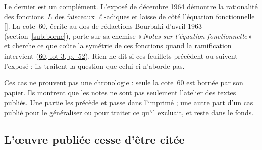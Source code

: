 \documentclass[11pt]{amsart}
\makeatletter
\newcommand{\q}[1]{«\,\textit{#1}\,»}
\def\RHM@first#1--#2\@nil{#1}
\DeclareRobustCommand{\lot}[3]{\begingroup\edef\RHM@pdfpage{\the\numexpr\RHM@first#3--\@nil+1\relax}\href{https://grothendieck.umontpellier.fr/#1.pdf\#page=\RHM@pdfpage}{#1, lot #2, p.~#3}\endgroup}
\newcommand{\lot}[3]{\href{https://grothendieck.commutator.io/\##1/#2/p#3}{#1, lot #2, p.~#3}}
\makeatother
\begin{document}
Le dernier est un complément. L'exposé de décembre 1964 démontre la rationalité des fonctions~$L$ des faisceaux $\ell$-adiques et laisse de côté l'équation fonctionnelle [\citealp{sb279}]. La cote~60, écrite au dos de rédactions Bourbaki d'avril 1963 (section~\ref{sub:borne}), porte sur sa chemise \q{Notes sur l'équation fonctionnelle} et cherche ce que coûte la symétrie de ces fonctions quand la ramification intervient (\lot{60}{3}{52}). Rien ne dit si ces feuillets précèdent ou suivent l'exposé ; ils traitent la question que celui-ci n'aborde pas.

Ces cas ne prouvent pas une chronologie : seule la cote~60 est bornée par son papier. Ils montrent que les notes ne sont pas seulement l'atelier des textes publiés. Une partie les précède et passe dans l'imprimé ; une autre part d'un cas publié pour le généraliser ou pour traiter ce qu'il excluait, et reste dans le fonds.

\subsection{L'œuvre publiée cesse d'être citée}\label{sub:imprime}
\end{document}
